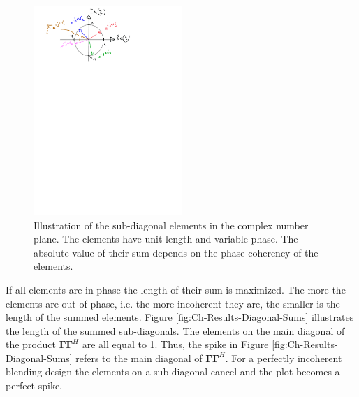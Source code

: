 \begin{figure}
	\centering
	\includegraphics[width = 0.5\textwidth]{Plots/complex-circle}
	\caption{Illustration of the sub-diagonal elements in the complex number plane. The elements have unit length and variable phase. The absolute value of their sum depends on the phase coherency of the elements.}
	\label{fig:Ch-Results-complex-circle}
\end{figure}


If all elements are in phase the length of their sum is maximized. The more the elements are out of phase, i.e. the more incoherent they are, the smaller is the length of the summed elements. Figure \ref{fig:Ch-Results-Diagonal-Sums} illustrates the length of the summed sub-diagonals. The elements on the main diagonal of the product $\mathbf{\Gamma \Gamma}^H$ are all equal to 1. Thus, the spike in Figure \ref{fig:Ch-Results-Diagonal-Sums} refers to the main diagonal of $\mathbf{\Gamma \Gamma}^H$. For a perfectly incoherent blending design the elements on a sub-diagonal cancel and the plot becomes a perfect spike. 


